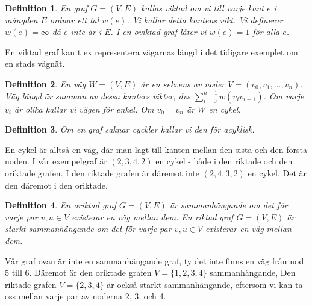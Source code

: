\documentclass[10pt,a4paper]{article}
\newtheorem{defn}{Definition}
\theoremstyle{problem}
\begin{document}
\begin{defn}
    En graf $G = (V, E)$ kallas \emph{viktad} om vi till varje kant $e$ i mängden $E$ ordnar ett tal $w(e)$. Vi kallar detta kantens \emph{vikt}.
    Vi definerar $w(e) = \infty$ då $e$ inte är i $E$. I en oviktad graf låter vi $w(e) = 1$ för alla $e$.
\end{defn}

En viktad graf kan t ex representera vägarnas längd i det tidigare exemplet om en stads vägnät.

\begin{defn}
    En \emph{väg} $W = (V, E)$ är en sekvens av noder $V = (v_0, v_1, ..., v_n)$. Väg \emph{längd} är summan av dessa kanters vikter, dvs $\sum_{i = 0}^{n-1}{w(v_iv_{i+1})}$.
    Om varje $v_i$ är olika kallar vi vägen för \emph{enkel}.
    Om $v_0 = v_n$ är $W$ en \emph{cykel}.
\end{defn}

\begin{defn}
	Om en graf saknar cyckler kallar vi den för \emph{acyklisk}.
\end{defn}

En cykel är alltså en väg, där man lagt till kanten mellan den sista och den första noden. I vår exempelgraf är $(2, 3, 4, 2)$ en cykel - både
i den riktade och den oriktade grafen. I den riktade grafen är däremot inte $(2, 4, 3, 2)$ en cykel. Det är den däremot i den oriktade.

\begin{defn}
    En oriktad graf $G = (V, E)$ är \emph{sammanhängande} om det för varje par $v, u \in V$ existerar en väg mellan dem.
    En riktad graf $G = (V, E)$ är \emph{starkt sammanhängande} om det för varje par $v, u \in V$ existerar en väg mellan dem.
\end{defn}

Vår graf ovan är inte en sammanhängande graf, ty det inte finns en väg från nod 5 till 6. Däremot är den oriktade grafen $V = \{1, 2, 3, 4\}$ sammanhängande,
Den riktade grafen $V = \{2, 3, 4\}$ är också starkt sammanhängande, eftersom vi kan ta oss mellan varje par av noderna 2, 3, och 4.
\end{document}
